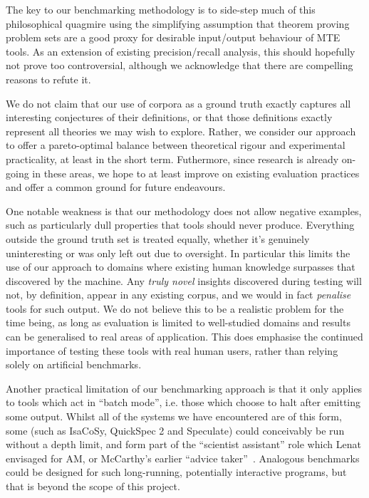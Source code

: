 The key to our benchmarking methodology is to side-step much of this
philosophical quagmire using the simplifying assumption that theorem proving
problem sets are a good proxy for desirable input/output behaviour of MTE tools.
As an extension of existing precision/recall analysis, this should hopefully not
prove too controversial, although we acknowledge that there are compelling
reasons to refute it.

We do not claim that our use of corpora as a ground truth exactly captures all
interesting conjectures of their definitions, or that those definitions exactly
represent all theories we may wish to explore. Rather, we consider our approach
to offer a pareto-optimal balance between theoretical rigour and experimental
practicality, at least in the short term. Futhermore, since research is already
on-going in these areas, we hope to at least improve on existing evaluation
practices and offer a common ground for future endeavours.

One notable weakness is that our methodology does not allow negative examples,
such as particularly dull properties that tools should never produce. Everything
outside the ground truth set is treated equally, whether it's genuinely
uninteresting or was only left out due to oversight. In particular this limits
the use of our approach to domains where existing human knowledge surpasses that
discovered by the machine. Any \emph{truly novel} insights discovered during
testing will not, by definition, appear in any existing corpus, and we would in
fact \emph{penalise} tools for such output. We do not believe this to be a
realistic problem for the time being, as long as evaluation is limited to
well-studied domains and results can be generalised to real areas of
application. This does emphasise the continued importance of testing these tools
with real human users, rather than relying solely on artificial benchmarks.

Another practical limitation of our benchmarking approach is that it only
applies to tools which act in ``batch mode'', i.e. those which choose to halt
after emitting some output. Whilst all of the systems we have encountered are of
this form, some (such as IsaCoSy, QuickSpec 2 and Speculate) could conceivably
be run without a depth limit, and form part of the ``scientist assistant'' role
which Lenat envisaged for AM, or McCarthy's earlier ``advice
taker''~\cite{McCarthy_Programs59}. Analogous benchmarks could be designed for
such long-running, potentially interactive programs, but that is beyond the
scope of this project.

